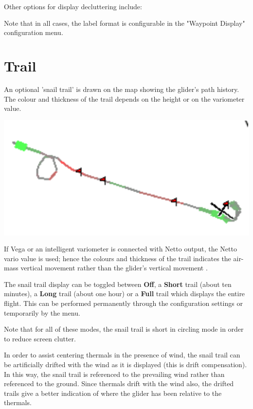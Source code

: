 Other options for display decluttering include:


Note that in all cases, the label format is configurable in the 
"Waypoint Display" configuration menu.  


\section{Trail}\label{sec:trail}

An optional 'snail trail' is drawn on the map showing the glider's
path history.  The colour and thickness of the trail depends on the height or
on the variometer value. 

\begin{center}
\includegraphics[angle=0,width=0.5\linewidth,keepaspectratio='true']{figures/snail.pdf}
\end{center}

If Vega or an intelligent variometer is connected with Netto output,
the Netto vario value is used; hence the colours and thickness of the
trail indicates the air-mass vertical movement rather than the glider's
vertical movement	.

The snail trail display can be toggled between {\bf Off}, a {\bf Short} trail
(about ten minutes), a {\bf Long} trail (about one hour) or a {\bf Full} trail
which displays the entire flight.  This can be performed permanently
through the configuration settings or temporarily by the
menu.

Note that for all of these modes, the snail trail is short in
circling mode in order to reduce screen clutter.

In order to assist centering thermals in the presence of wind, the
snail trail can be artificially drifted with the wind as it is
displayed (this is drift compensation).  In this way, the snail trail
is referenced to the prevailing wind rather than referenced to the
ground.  Since thermals drift with the wind also, the drifted trails
give a better indication of where the glider has been relative to the
thermals.

